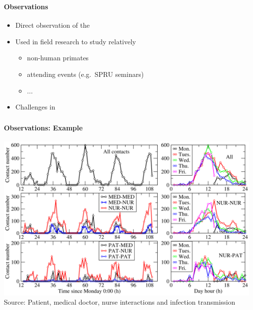 \documentclass[8pt]{beamer}
\begin{document}
\begin{frame}
\frametitle{\insertsection}
\framesubtitle{Observations}

\begin{itemize}
\item Direct observation of the {\color{blue}{interaction among actors}}
\item Used in field research to study relatively {\color{blue}{small groups}}
    \begin{itemize}
    \item non-human primates
    \item attending events (e.g.\ SPRU seminars)
    \item ...
    \end{itemize}
\item Challenges in {\color{red}{observing  multiple actors simultaneously}}
\end{itemize}

\end{frame}


\begin{frame}
\frametitle{\insertsection}
\framesubtitle{Observations: Example}
\centering
\includegraphics[width=\linewidth,height=0.75\textheight,keepaspectratio]{rfid}\\
\tiny Source: Patient, medical doctor, nurse interactions and infection transmission \citep{Vanhems2013}
\end{frame}

\end{document}
